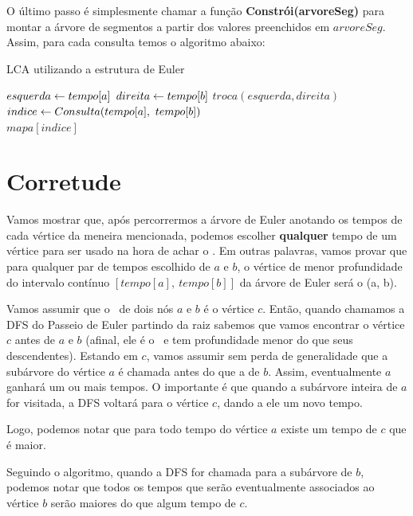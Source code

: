 \vspace{0.5cm}

O último passo é simplesmente chamar a função \textbf{Constrói(arvoreSeg)} para montar a árvore de segmentos a partir dos valores preenchidos em $arvoreSeg$. Assim, para cada consulta temos o algoritmo abaixo:

\begin{algorithm}[H]
\caption{LCA utilizando a estrutura de Euler}
\begin{algorithmic}[1]
    \State $esquerda \leftarrow tempo[a]$
    \State $direita \leftarrow tempo[b]$
        \State $troca(esquerda, direita)$
    \EndIf
    \State $indice \rec Consulta(tempo[a],\ tempo[b])$
    \\\hspace{5mm} \Return $mapa[indice]$
\EndFunction
\end{algorithmic}
\end{algorithm}

\section{Corretude}

Vamos mostrar que, após percorrermos a árvore de Euler anotando os tempos de cada vértice da meneira mencionada, podemos escolher \textbf{qualquer} tempo de um vértice para ser usado na hora de achar o \LCA. Em outras palavras, vamos provar que para qualquer par de tempos escolhido de $a$ e $b$, o vértice de menor profundidade do intervalo contínuo $[tempo[a],\ tempo[b]]$ da árvore de Euler será o \LCA(a, b).

\vspace{0.5cm}

Vamos assumir que o \LCA\ de dois nós $a$ e $b$ é o vértice $c$. Então, quando chamamos a DFS do Passeio de Euler partindo da raiz sabemos que vamos encontrar o vértice $c$ antes de $a$ e $b$ (afinal, ele é o \LCA\ e tem profundidade menor do que seus descendentes). Estando em $c$, vamos assumir sem perda de generalidade que a subárvore do vértice $a$ é chamada antes do que a de $b$. Assim, eventualmente $a$ ganhará um ou mais tempos. O importante é que quando a subárvore inteira de $a$ for visitada, a DFS voltará para o vértice $c$, dando a ele um novo tempo.

Logo, podemos notar que para todo tempo do vértice $a$ existe um tempo de $c$ que é maior.

Seguindo o algoritmo, quando a DFS for chamada para a subárvore de $b$, podemos notar que todos os tempos que serão eventualmente associados ao vértice $b$ serão maiores do que algum tempo de $c$.

